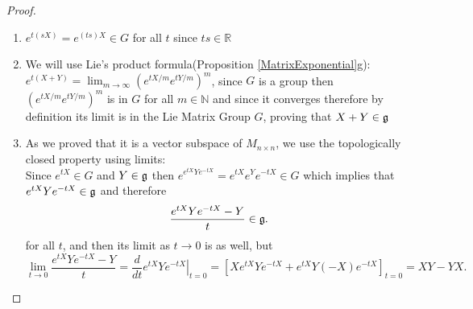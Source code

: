 \begin{proof}
\begin{enumerate}[label=(\alph*)]
	\item $e^{t(sX)}=e^{(ts)X} \in G$ for all $t$ since $ts \in \mathbb{R}$
	\item We will use Lie's product formula(Proposition \ref{MatrixExponential}g):
	$e^{t(X+Y)} = \lim_{m \rightarrow \infty}(e^{tX/m}e^{tY/m})^m$, since $G$ is a group then $(e^{tX/m}e^{tY/m})^m$ is in $G$ for all $m \in \mathbb{N}$ and since it converges therefore by definition its limit is in the Lie Matrix Group $G$, proving that $X+Y \in \mathfrak{g}$
	\item As we proved that it is a vector subspace of $M_{n\times n}$, we use the topologically closed property using limits:\\
	Since $e^{tX} \in G$ and $Y \in \mathfrak{g}$ then $e^{e^{tX}Ye^{-tX}} = e^{tX}e^{Y}e^{-tX} \in G$ which implies that $e^{tX}Ye^{-tX} \in\mathfrak{g}$ and therefore $$\frac{e^{tX}Ye^{-tX}-Y}{t} \in \mathfrak{g}.$$ for all $t$, and then its limit as $t\rightarrow 0$ is as well, but 
	$$\lim_{t\rightarrow 0}\frac{e^{tX}Ye^{-tX}-Y}{t} = \frac{d}{dt} \left.e^{tX}Ye^{-tX}\right|_{t=0} = [Xe^{tX}Ye^{-tX} + e^{tX}Y(-X)e^{-tX}]_{t=0} = XY-YX.$$
\end{enumerate}
\end{proof}
